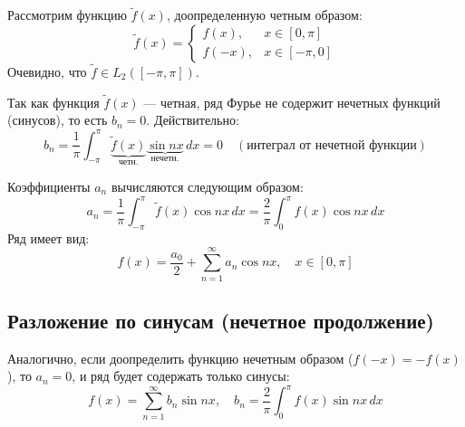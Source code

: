 \documentclass[12pt,a4paper,openany]{book}
\begin{document}
Рассмотрим функцию $\tilde{f}(x)$, доопределенную четным образом:
$$
\tilde{f}(x) = \begin{cases} 
f(x), & x \in [0, \pi] \\
f(-x), & x \in [-\pi, 0]
\end{cases}
$$
Очевидно, что $\tilde{f} \in L_2([-\pi, \pi])$.

\begin{center}
\end{center}

Так как функция $\tilde{f}(x)$ — четная, ряд Фурье не содержит нечетных функций (синусов), то есть $b_n = 0$.
Действительно:
$$
b_n = \frac{1}{\pi} \int_{-\pi}^{\pi} \underbrace{\tilde{f}(x)}_{\text{четн.}} \underbrace{\sin nx}_{\text{нечетн.}} \, dx = 0 \quad (\text{интеграл от нечетной функции})
$$

Коэффициенты $a_n$ вычисляются следующим образом:
$$
a_n = \frac{1}{\pi} \int_{-\pi}^{\pi} \tilde{f}(x) \cos nx \, dx = \frac{2}{\pi} \int_{0}^{\pi} f(x) \cos nx \, dx
$$
Ряд имеет вид:
$$
f(x) = \frac{a_0}{2} + \sum_{n=1}^{\infty} a_n \cos nx, \quad x \in [0, \pi]
$$

\subsection{Разложение по синусам (нечетное продолжение)}
Аналогично, если доопределить функцию нечетным образом ($f(-x) = -f(x)$), то $a_n = 0$, и ряд будет содержать только синусы:
$$
f(x) = \sum_{n=1}^{\infty} b_n \sin nx, \quad b_n = \frac{2}{\pi} \int_{0}^{\pi} f(x) \sin nx \, dx
$$
\end{document}
